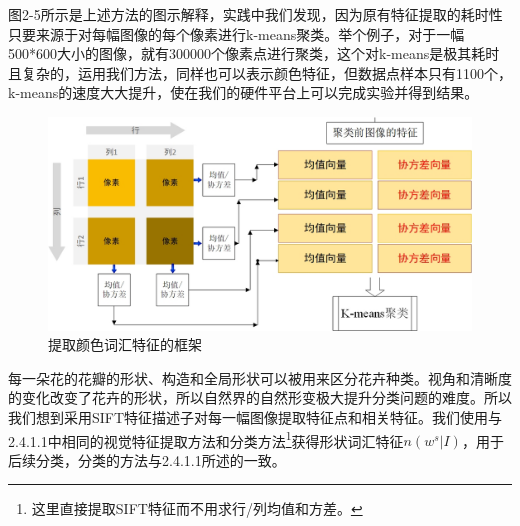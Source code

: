 \documentclass[supercite]{HustGraduPaper}
\begin{document}
\begin{sloppypar}
  图2-5所示是上述方法的图示解释，实践中我们发现，因为原有特征提取的耗时性只要来源于对每幅图像的每个像素进行k-means聚类。举个例子，对于一幅500*600大小的图像，就有300000个像素点进行聚类，这个对k-means是极其耗时且复杂的，运用我们方法，同样也可以表示颜色特征，但数据点样本只有1100个，k-means的速度大大提升，使在我们的硬件平台上可以完成实验并得到结果。
  \begin{figure}[H]
    \setlength{\abovecaptionskip}{0.2cm}
    \setlength{\belowcaptionskip}{-0.cm}
      \centering%
      \includegraphics[scale=0.5]{8.jpg}
      \caption{提取颜色词汇特征的框架}
    \end{figure}
  每一朵花的花瓣的形状、构造和全局形状可以被用来区分花卉种类。视角和清晰度的变化改变了花卉的形状，所以自然界的自然形变极大提升分类问题的难度。所以我们想到采用SIFT特征描述子对每一幅图像提取特征点和相关特征。我们使用与2.4.1.1中相同的视觉特征提取方法和分类方法\footnote{这里直接提取SIFT特征而不用求行/列均值和方差。}获得形状词汇特征$n(w^s|I)$，用于后续分类，分类的方法与2.4.1.1所述的一致。


\end{sloppypar}
\end{document}
